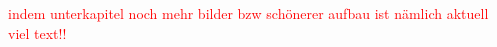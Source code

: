 \documentclass[11pt, a4paper, german]{article}
\newcommand{\TM}{Technology Mapping }
\begin{document}
 \textcolor{red}{ indem unterkapitel noch mehr bilder bzw schönerer aufbau ist nämlich aktuell viel text!!}
 

\end{document}
